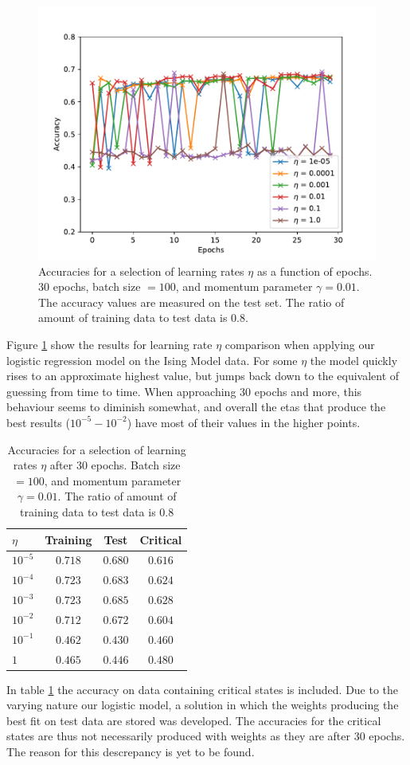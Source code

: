 \begin{figure}[H]
\includegraphics[width = 0.8\paperwidth]{figures/logistic_eta.pdf}
    \caption{Accuracies for a selection of learning rates $\eta$ as a function of epochs. 
    30 epochs, batch size $= 100$, and momentum parameter $\gamma = 0.01$. The accuracy
    values are measured on the test set.
    The ratio of amount of training data to test data is $0.8$.}
\label{fig:logistic-eta}
\end{figure}
Figure \ref{fig:logistic-eta} show the results for learning rate $\eta$ comparison when applying
our logistic regression model on the Ising Model data. For some $\eta$ the model quickly rises
to an approximate highest value, but jumps back down to the equivalent of guessing from time
to time. When approaching 30 epochs and more, this behaviour seems to diminish somewhat, and
overall the etas that produce the best results ($10^{-5} - 10^{-2}$) have most of their values
in the higher points.
\begin{table}[H]
\center
\begin{tabular}{l|c|c|c}
$\eta$ & Training & Test & Critical  \\
\hline
$10^{-5}$ & $0.718$ & $0.680$ & $0.616$ \\
$10^{-4}$ & $0.723$ & $0.683$ & $0.624$ \\
$10^{-3}$ & $0.723$ & $0.685$ & $0.628$ \\
$10^{-2}$ & $0.712$ & $0.672$ & $0.604$ \\
$10^{-1}$ & $0.462$ & $0.430$ & $0.460$ \\
$1$    & $0.465$ & $0.446$ & $0.480$
\end{tabular}
    \caption{Accuracies for a selection of learning rates $\eta$ after 
    30 epochs. Batch size $= 100$, and momentum parameter $\gamma = 0.01$.
    The ratio of amount of training data to test data is $0.8$}
    \label{tab:logistic-critical}
\end{table}
In table \ref{tab:logistic-critical} the accuracy on data containing critical states
is included. Due to the varying nature our logistic model, a solution in which the weights
producing the best fit on test data are stored was developed. The accuracies for the critical
states are thus not necessarily produced with weights as they are after 30 epochs. The reason for this descrepancy is yet to be found.

